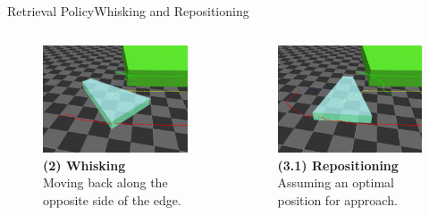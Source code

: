 \documentclass[AIRbeamer
,optEnglish
,optBiber
,optBibstyleAlphabetic
,optBeamerClassicFormat%
]{AIRlatex}
\begin{document}
    \begin{frame}[c]{Retrieval Policy}{Whisking and Repositioning}
        \begin{columns}[T,onlytextwidth]
            \begin{column}[T]{0.48\textwidth}
                \begin{figure}[H]
                    \centering
                    \captionsetup{justification=centering}
                    \includegraphics[width=\textwidth]{figures/retrieval/whisking}
                    \caption{\textbf{(2) Whisking}\\Moving back along the opposite side of the edge.}
                \end{figure}
            \end{column}
            \begin{column}[T]{0.48\textwidth}
                \begin{figure}[H]
                    \centering
                    \captionsetup{justification=centering}
                    \includegraphics[width=\textwidth]{figures/retrieval/repositioning}
                    \caption{\textbf{(3.1) Repositioning}\\Assuming an optimal position for approach.}
                \end{figure}
            \end{column}
        \end{columns}
    \end{frame}
\end{document}
